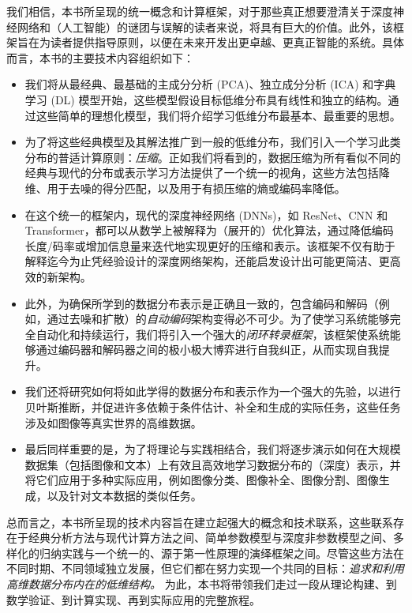 \documentclass[../../book-main.tex]{subfiles}
\begin{document}
我们相信，本书所呈现的统一概念和计算框架，对于那些真正想要澄清关于深度神经网络和（人工智能）的谜团与误解的读者来说，将具有巨大的价值。此外，该框架旨在为读者提供指导原则，以便在未来开发出更卓越、更真正智能的系统。具体而言，本书的主要技术内容组织如下：
\begin{itemize}
\item 我们将从最经典、最基础的主成分分析 (PCA)、独立成分分析 (ICA) 和字典学习 (DL) 模型开始，这些模型假设目标低维分布具有线性和独立的结构。通过这些简单的理想化模型，我们将介绍学习低维分布最基本、最重要的思想。

\item 为了将这些经典模型及其解法推广到一般的低维分布，我们引入一个学习此类分布的普适计算原则：{\em 压缩}。正如我们将看到的，数据压缩为所有看似不同的经典与现代的分布或表示学习方法提供了一个统一的视角，这些方法包括降维、用于去噪的得分匹配，以及用于有损压缩的熵或编码率降低。

\item 在这个统一的框架内，现代的深度神经网络 (DNNs)，如 ResNet、CNN 和 Transformer，都可以从数学上被解释为（展开的）优化算法，通过降低编码长度/码率或增加信息量来迭代地实现更好的压缩和表示。该框架不仅有助于解释迄今为止凭经验设计的深度网络架构，还能启发设计出可能更简洁、更高效的新架构。

\item 此外，为确保所学到的数据分布表示是正确且一致的，包含编码和解码（例如，通过去噪和扩散）的{\em 自动编码}架构变得必不可少。为了使学习系统能够完全自动化和持续运行，我们将引入一个强大的{\em 闭环转录框架}，该框架使系统能够通过编码器和解码器之间的极小极大博弈进行自我纠正，从而实现自我提升。

\item 我们还将研究如何将如此学得的数据分布和表示作为一个强大的先验，以进行贝叶斯推断，并促进许多依赖于条件估计、补全和生成的实际任务，这些任务涉及如图像等真实世界的高维数据。

\item 最后同样重要的是，为了将理论与实践相结合，我们将逐步演示如何在大规模数据集（包括图像和文本）上有效且高效地学习数据分布的（深度）表示，并将它们应用于多种实际应用，例如图像分类、图像补全、图像分割、图像生成，以及针对文本数据的类似任务。
\end{itemize}

总而言之，本书所呈现的技术内容旨在建立起强大的概念和技术联系，这些联系存在于经典分析方法与现代计算方法之间、简单参数模型与深度非参数模型之间、多样化的归纳实践与一个统一的、源于第一性原理的演绎框架之间。尽管这些方法在不同时期、不同领域独立发展，但它们都在努力实现一个共同的目标：{\em 追求和利用高维数据分布内在的低维结构。} 为此，本书将带领我们走过一段从理论构建、到数学验证、到计算实现、再到实际应用的完整旅程。
\end{document}
